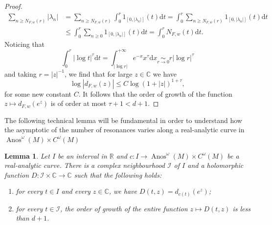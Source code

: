 \documentclass[10pt]{amsart}
\newtheorem{lemm}[theo]{Lemma}\newtheorem{prop}[theo]{Proposition}\newtheorem{coro}[theo]{Corollary}\newtheorem{conj}[theo]{Conjecture}
\theoremstyle{definition}\newtheorem{defi}[theo]{Definition}\newtheorem{rema}[theo]{Remark}\newtheorem{exam}[theo]{Example}\newtheorem{exem}[theo]{Example}\newtheorem{nota}[theo]{Notation}
\DeclareMathOperator{\Anos}{Anos}
\newcommand{\clI}{\mathcal{I}}
\newcommand{\bbC}{\mathbb{C}}
\newcommand{\bbR}{\mathbb{R}}
\newcommand{\rmd}{\mathrm{d}}
\newcommand*{\romanenumi}{\renewcommand*{\theenumi}{\roman{enumi}}}
\begin{document}
\begin{proof}
\begin{equation*}
\begin{split}
\sum_{n \geq N_{F,w}(r)}|\lambda_n| & = \sum_{n \geq N_{F,w}(r)} \int_0^r 1_{[0,|\lambda_n|]}(t) \rmd t = \int_0^r \sum_{n \geq N_{F,w}(r)} 1_{[0,|\lambda_n|]}(t) \rmd t \\
& \leq \int_0^r \sum_{n \geq 0} 1_{[0,|\lambda_n|]}(t) \rmd t = \int_0^r N_{F,w}(t) \rmd t.
\end{split}
\end{equation*}
Noticing that
\begin{equation*}
\int_{0}^r |\log t|^\tau \rmd t = \int_{|\log r|}^{+ \infty} e^{-x}x^\tau \rmd x \underset{r \to 0}{\sim} r|\log r|^\tau
\end{equation*}
and taking $r = |z|^{-1}$, we find that for large $z \in \bbC$ we have
\begin{equation*}
\log |d_{F,w}(z)| \leq C \log(1 + |z|)^{1+\tau},
\end{equation*}
for some new constant $C$. It follows that the order of growth of the function $z \mapsto d_{F,w}(e^z)$ is of order at most $\tau + 1 < d+1$.
\end{proof}

The following technical lemma will be fundamental in order to understand how the asymptotic of the number of resonances varies along a real-analytic curve in $\Anos^\omega(M) \times C^\omega(M)$

\begin{lemm}\label{lemma:family_determinant}
Let $I$ be an interval in $\bbR$ and $c : I \to \Anos^\omega(M) \times C^\omega(M)$ be a real-analytic curve. There is a complex neighbourhood $\clI $ of $I$ and a holomorphic function $D : \clI \times \bbC \to \bbC$ such that the following holds:
\begin{enumerate}\romanenumi
\item\label{lemm4.9.1} for every $t \in I$ and every $z \in \bbC$, we have $D(t,z) = d_{c(t)}(e^z)$;
\item\label{lemm4.9.2} for every $t \in \clI $, the order of growth of the entire function $z \mapsto D(t,z)$ is less than $d+1$.
\end{enumerate}
\end{lemm}
\end{document}
